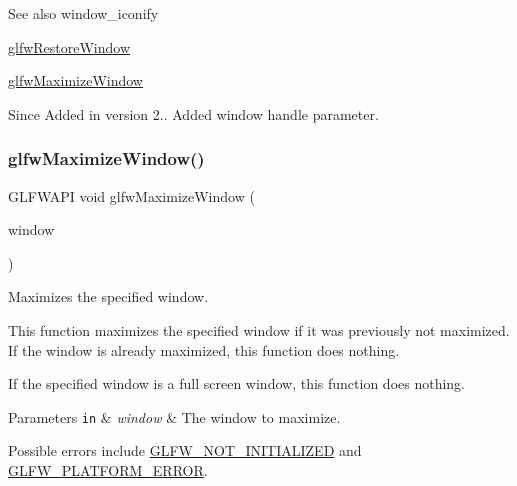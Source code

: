 \begin{DoxySeeAlso}{See also}
window\+\_\+iconify 

\hyperlink{group__window_ga1e29caf0b819f578b04db52fff17256c}{glfw\+Restore\+Window} 

\hyperlink{group__window_ga4f825a55367d3fabde3d06e7f30128e8}{glfw\+Maximize\+Window}
\end{DoxySeeAlso}
\begin{DoxySince}{Since}
Added in version 2..  Added window handle parameter. 
\end{DoxySince}
\mbox{\label{group__window_ga4f825a55367d3fabde3d06e7f30128e8}} 
\subsubsection{\texorpdfstring{glfw\+Maximize\+Window()}{glfwMaximizeWindow()}}
{\footnotesize\ttfamily G\+L\+F\+W\+A\+PI void glfw\+Maximize\+Window (\begin{DoxyParamCaption}\item[{\hyperlink{group__window_ga3c96d80d363e67d13a41b5d1821f3242}{G\+L\+F\+Wwindow} $\ast$}]{window }\end{DoxyParamCaption})}



Maximizes the specified window. 

This function maximizes the specified window if it was previously not maximized. If the window is already maximized, this function does nothing.

If the specified window is a full screen window, this function does nothing.


\begin{DoxyParams}[1]{Parameters}
\mbox{\tt in}  & {\em window} & The window to maximize.\\
\hline
\end{DoxyParams}
Possible errors include \hyperlink{group__errors_ga2374ee02c177f12e1fa76ff3ed15e14a}{G\+L\+F\+W\+\_\+\+N\+O\+T\+\_\+\+I\+N\+I\+T\+I\+A\+L\+I\+Z\+ED} and \hyperlink{group__errors_gad44162d78100ea5e87cdd38426b8c7a1}{G\+L\+F\+W\+\_\+\+P\+L\+A\+T\+F\+O\+R\+M\+\_\+\+E\+R\+R\+OR}.

